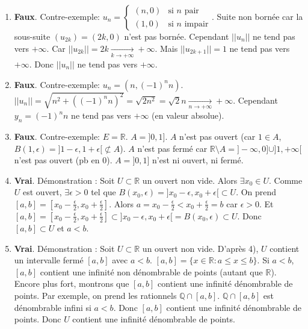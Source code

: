 \documentclass[oneside]{book}
\begin{document}
\begin{solution}
\begin{enumerate}
    \item \textbf{Faux}. Contre-exemple: $u_n = \begin{cases} (n, 0) & \text{si } n \text{ pair} \\ (1, 0) & \text{si } n \text{ impair} \end{cases}$.
      Suite non bornée car la sous-suite $(u_{2k}) = (2k, 0)$ n'est pas bornée.
      Cependant $||u_n||$ ne tend pas vers $+\infty$. Car $||u_{2k}|| = 2k \xrightarrow[k \to +\infty]{} +\infty$. Mais $||u_{2k+1}|| = 1$ ne tend pas vers $+\infty$.
      Donc $||u_n||$ ne tend pas vers $+\infty$.

    \item \textbf{Faux}. Contre-exemple: $u_n = (n, (-1)^n n)$. $||u_n|| = \sqrt{n^2 + ((-1)^n n)^2} = \sqrt{2n^2} = \sqrt{2} n \xrightarrow[n \to +\infty]{} +\infty$.
    Cependant $y_n = (-1)^n n$ ne tend pas vers $+\infty$ (en valeur absolue).

    \item \textbf{Faux}. Contre-exemple: $E = \mathbb{R}$. $A = ]0, 1]$. $A$ n'est pas ouvert (car $1 \in A$, $B(1, \epsilon) = ]1 - \epsilon, 1 + \epsilon[ \not\subset A$). $A$ n'est pas fermé car $\mathbb{R} \setminus A = ]-\infty, 0] \cup ]1, +\infty[$ n'est pas ouvert (pb en $0$).
    $A = ]0, 1]$ n'est ni ouvert, ni fermé.

    \item \textbf{Vrai}. Démonstration : Soit $U \subset \mathbb{R}$ un ouvert non vide. Alors $\exists x_0 \in U$. Comme $U$ est ouvert, $\exists \epsilon > 0$ tel que $B(x_0, \epsilon) = ]x_0 - \epsilon, x_0 + \epsilon[ \subset U$.
    On prend $[a, b] = [x_0 - \frac{\epsilon}{2}, x_0 + \frac{\epsilon}{2}]$. Alors $a = x_0 - \frac{\epsilon}{2} < x_0 + \frac{\epsilon}{2} = b$ car $\epsilon > 0$. Et $[a, b] = [x_0 - \frac{\epsilon}{2}, x_0 + \frac{\epsilon}{2}] \subset ]x_0 - \epsilon, x_0 + \epsilon[ = B(x_0, \epsilon) \subset U$.
    Donc $[a, b] \subset U$ et $a < b$.

    \item \textbf{Vrai}. Démonstration : Soit $U \subset \mathbb{R}$ un ouvert non vide. D'après 4), $U$ contient un intervalle fermé $[a, b]$ avec $a < b$.
    $[a, b] = \{x \in \mathbb{R} : a \leq x \leq b\}$. Si $a < b$, $[a, b]$ contient une infinité non dénombrable de points (autant que $\mathbb{R}$).
    Encore plus fort, montrons que $[a, b]$ contient une infinité dénombrable de points.
    Par exemple, on prend les rationnels $\mathbb{Q} \cap [a, b]$. $\mathbb{Q} \cap [a, b]$ est dénombrable infini si $a < b$.
    Donc $[a, b]$ contient une infinité dénombrable de points.
    Donc $U$ contient une infinité dénombrable de points.
\end{enumerate}
\end{solution}
\end{document}
